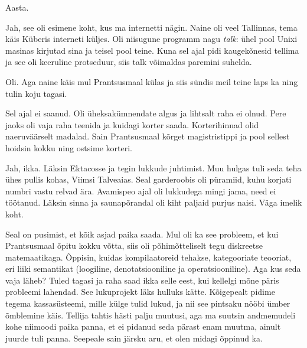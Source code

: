 
Aasta. 


Jah, see oli esimene koht, kus ma internetti nägin. Naine oli veel Tallinnas, 
tema käis Küberis interneti küljes. Oli niisugune programm nagu \emph{talk}: 
ühel pool Unixi masinas kirjutad sina ja teisel pool teine. Kuna sel ajal pidi
kaugekõnesid tellima ja see oli keeruline protseduur, siis
talk võimaldas paremini suhelda.


Oli. Aga naine käis mul Prantsusmaal külas ja siis sündis meil teine 
laps ka ning tulin koju tagasi.


Sel ajal ei saanud. Oli üheksakümnendate algus ja lihtsalt raha ei olnud. Pere jaoks oli vaja raha teenida ja kuidagi korter saada. 
Korterihinnad olid naeruväärselt madalad. Sain 
Prantsusmaal kõrget magistristippi ja pool sellest hoidsin kokku 
ning ostsime korteri.


Jah, ikka. Läksin Ektacosse ja tegin lukkude juhtimist. 
Muu hulgas tuli seda teha ühes pullis kohas, Viimsi 
Talveaias. Seal garderoobis oli püramiid, kuhu korjati numbri vastu 
relvad ära. Avamispeo ajal oli lukkudega mingi jama, need ei töötanud. Läksin sinna ja saunapõrandal oli kiht paljaid purjus 
naisi. Väga imelik koht.
 
 
Seal on pusimist, et kõik asjad paika saada. Mul oli ka see 
probleem, et kui Prantsusmaal õpitu kokku võtta, siis oli põhimõtteliselt tegu diskreetse matemaatikaga. Õppisin, kuidas kompilaatoreid tehakse, 
kategooriate teooriat, eri liiki semantikat (loogiline, denotatsiooniline ja 
operatsiooniline). Aga kus seda vaja 
läheb? Tuled tagasi ja raha saad ikka selle eest, kui kellelgi mõne päris 
probleemi lahendad. See lukuprojekt läks hulluks kätte. Kõigepealt 
pidime tegema kassasüsteemi, mille külge tulid lukud, ja nii see pintsaku 
nööbi ümber õmblemine käis. Tellija tahtis hästi palju muutusi, aga ma suutsin andmemudeli kohe niimoodi paika panna, et ei pidanud seda 
pärast enam muutma, ainult juurde tuli panna. Seepeale sain järsku 
aru, et olen midagi õppinud ka.

